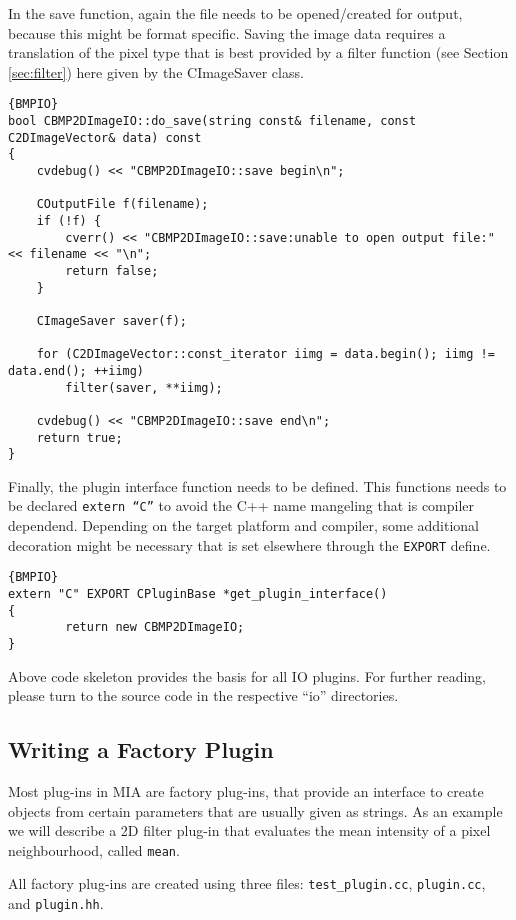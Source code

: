 \documentclass[english, 10pt, a4paper,headsepline,openany]{scrbook}
\begin{document}
\noindent 
In the save function, again the file needs to be opened/created for output, because this might be format specific. 
Saving the image data requires a translation of the pixel type that is best provided by a filter 
  function (see Section \ref{sec:filter}) here given by the CImageSaver class.
\begin{lstlisting}{BMPIO}
bool CBMP2DImageIO::do_save(string const& filename, const C2DImageVector& data) const
{
	cvdebug() << "CBMP2DImageIO::save begin\n"; 
	
	COutputFile f(filename);
	if (!f) {
		cverr() << "CBMP2DImageIO::save:unable to open output file:" << filename << "\n"; 
		return false; 
	}
		
	CImageSaver saver(f); 
	
	for (C2DImageVector::const_iterator iimg = data.begin(); iimg != data.end(); ++iimg)
		filter(saver, **iimg); 
	
	cvdebug() << "CBMP2DImageIO::save end\n"; 
	return true; 
}
\end{lstlisting}

\noindent 
Finally, the plugin interface function needs to be defined. 
This functions needs to be declared \texttt{extern ``C''} to avoid the C++ name mangeling that is compiler dependend. 
Depending on the target platform and compiler, some additional decoration might be necessary that is set elsewhere 
  through the \texttt{EXPORT} define.
\begin{lstlisting}{BMPIO}
extern "C" EXPORT CPluginBase *get_plugin_interface()
{
		return new CBMP2DImageIO;
}
\end{lstlisting}

\noindent 
Above code skeleton provides the basis for all IO plugins. 
For further reading, please turn to the source code in the respective ``io'' directories.

\subsection{Writing a Factory Plugin}
\label{ch:filterplugin}

Most plug-ins in MIA are factory plug-ins, that provide an interface to create objects from certain 
  parameters that are usually given as strings. 
As an example we will describe a 2D filter plug-in that evaluates the mean intensity of a 
  pixel neighbourhood, called \texttt{mean}. 

All factory plug-ins are created using three files: \texttt{test\_plugin.cc}, \texttt{plugin.cc}, 
  and \texttt{plugin.hh}. 
\end{document}
